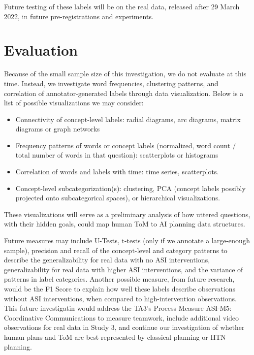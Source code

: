 Future testing of these labels will be on the real data, released after 29 March 2022, in future pre-registrations and experiments. 






\section{Evaluation}

Because of the small sample size of this investigation, we do not evaluate at
this time. Instead, we investigate word frequencies, clustering patterns, and
correlation of annotator-generated labels through data visualization. Below is
a list of possible visualizations we may consider:

\begin{itemize}
    \item Connectivity of concept-level labels: radial diagrams, arc diagrams, matrix diagrams or graph networks
    \item Frequency patterns of words or concept labels (normalized, word count / total number of words in that question): scatterplots or histograms
    \item Correlation of words and labels with time: time series, scatterplots. 
    \item Concept-level subcategorization(s): clustering, PCA (concept labels possibly projected onto subcategorical spaces), or hierarchical visualizations.
\end{itemize}


These visualizations will serve as a preliminary analysis of how uttered questions, with their hidden goals, could map  human ToM to AI planning data structures.

Future measures may include U-Tests, t-tests (only if we annotate a large-enough sample), precision and recall of the
concept-level and category patterns to describe the generalizability for real data with no ASI interventions, generalizability for
real data with higher ASI interventions, and the variance of patterns in label categories. Another possible measure, from future research, would be the F1 Score to explain how
well these labels describe observations without ASI interventions, when compared to
high-intervention observations. This future investigatin would address the TA3’s Process Measure ASI-M5: Coordinative Communications   to measure teamwork, include additional video observations for real data in Study 3, and continue our investigation of whether human plans and ToM are best represented by classical planning or HTN planning.


